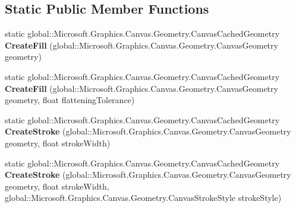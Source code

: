 \subsection*{Static Public Member Functions}
\begin{DoxyCompactItemize}
\item 
\mbox{\label{class_microsoft_1_1_graphics_1_1_canvas_1_1_geometry_1_1_canvas_cached_geometry_af7e1928aa632df9afaf353ce0742c681}} 
static global\+::\+Microsoft.\+Graphics.\+Canvas.\+Geometry.\+Canvas\+Cached\+Geometry {\bfseries Create\+Fill} (global\+::\+Microsoft.\+Graphics.\+Canvas.\+Geometry.\+Canvas\+Geometry geometry)
\item 
\mbox{\label{class_microsoft_1_1_graphics_1_1_canvas_1_1_geometry_1_1_canvas_cached_geometry_a2c9216474020d5f402b1611e0163c891}} 
static global\+::\+Microsoft.\+Graphics.\+Canvas.\+Geometry.\+Canvas\+Cached\+Geometry {\bfseries Create\+Fill} (global\+::\+Microsoft.\+Graphics.\+Canvas.\+Geometry.\+Canvas\+Geometry geometry, float flattening\+Tolerance)
\item 
\mbox{\label{class_microsoft_1_1_graphics_1_1_canvas_1_1_geometry_1_1_canvas_cached_geometry_a4f114bf6d46b1633a620e968a8a06653}} 
static global\+::\+Microsoft.\+Graphics.\+Canvas.\+Geometry.\+Canvas\+Cached\+Geometry {\bfseries Create\+Stroke} (global\+::\+Microsoft.\+Graphics.\+Canvas.\+Geometry.\+Canvas\+Geometry geometry, float stroke\+Width)
\item 
\mbox{\label{class_microsoft_1_1_graphics_1_1_canvas_1_1_geometry_1_1_canvas_cached_geometry_a633b11623db3794a3d6109c028ed844f}} 
static global\+::\+Microsoft.\+Graphics.\+Canvas.\+Geometry.\+Canvas\+Cached\+Geometry {\bfseries Create\+Stroke} (global\+::\+Microsoft.\+Graphics.\+Canvas.\+Geometry.\+Canvas\+Geometry geometry, float stroke\+Width, global\+::\+Microsoft.\+Graphics.\+Canvas.\+Geometry.\+Canvas\+Stroke\+Style stroke\+Style)
\item 
\mbox{\label{class_microsoft_1_1_graphics_1_1_canvas_1_1_geometry_1_1_canvas_cached_geometry_ae99898b363893b988831d61f23817ef5}} 

\end{DoxyCompactItemize}
